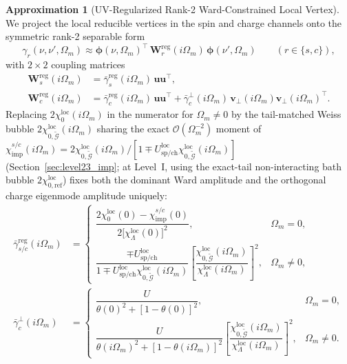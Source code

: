 \documentclass[11pt,a4paper]{article}
\numberwithin{equation}{section}
\theoremstyle{plain}
\theoremstyle{definition}
\newtheorem{approximation}{Approximation}[section]
\begin{document}
\begin{approximation}[UV-Regularized Rank-2 Ward-Constrained Local Vertex]
\label{approx:rank2_Wc}
We project the local reducible vertices in the spin and charge channels onto the
symmetric rank-2 separable form
\begin{equation}
    \gamma_r(\nu,\nu',\Omega_m)
    \approx \boldsymbol{\phi}(\nu,\Omega_m)^\top\,
            \mathbf{W}_r^{\mathrm{reg}}(i\Omega_m)\,
            \boldsymbol{\phi}(\nu',\Omega_m)
    \qquad (r \in \{s,c\}),
    \label{eq:gamma_rank2}
\end{equation}
with $2\times 2$ coupling matrices
\begin{align}
    \mathbf{W}_s^{\mathrm{reg}}(i\Omega_m)
    &= \bar{\gamma}_s^{\mathrm{reg}}(i\Omega_m)\, \mathbf{u}\mathbf{u}^\top,
    \label{eq:gamma_s_mat} \\
    \mathbf{W}_c^{\mathrm{reg}}(i\Omega_m)
    &= \bar{\gamma}_c^{\mathrm{reg}}(i\Omega_m)\, \mathbf{u}\mathbf{u}^\top
       + \bar{\gamma}_c^{\perp}(i\Omega_m)\, \mathbf{v}_\perp(i\Omega_m)\mathbf{v}_\perp(i\Omega_m)^\top.
    \label{eq:gamma_c_mat}
\end{align}
Replacing $2\chi_0^{\mathrm{loc}}(i\Omega_m)$ in the numerator for $\Omega_m \neq 0$ by
the tail-matched Weiss bubble $2\chi_{0,\tilde{\mathcal{G}}}^{\mathrm{loc}}(i\Omega_m)$
sharing the exact $\mathcal{O}(\Omega_m^{-2})$ moment of
$\chi_{\mathrm{imp}}^{s/c}(i\Omega_m) = 2\chi_{0,\tilde{\mathcal{G}}}^{\mathrm{loc}}(i\Omega_m)/[1 \mp U_{\mathrm{sp/ch}}^{\mathrm{loc}}\chi_{0,\tilde{\mathcal{G}}}^{\mathrm{loc}}(i\Omega_m)]$
(Section~\ref{sec:level23_imp}; at Level~I, using the exact-tail non-interacting bath
bubble $2\chi_{0,\mathrm{ref}}^{\mathrm{loc}}$) fixes both the dominant Ward amplitude
and the orthogonal charge eigenmode amplitude uniquely:
\begin{align}
    \bar{\gamma}_{s/c}^{\mathrm{reg}}(i\Omega_m)
    &= \begin{cases}
        \dfrac{2\chi_0^{\mathrm{loc}}(0) - \chi_{\mathrm{imp}}^{s/c}(0)}
              {2\bigl[\chi_{\Lambda}^{\mathrm{loc}}(0)\bigr]^2}, & \Omega_m = 0, \\[2.4ex]
        \dfrac{\mp U_{\mathrm{sp/ch}}^{\mathrm{loc}}}
              {1 \mp U_{\mathrm{sp/ch}}^{\mathrm{loc}}\chi_{0,\tilde{\mathcal{G}}}^{\mathrm{loc}}(i\Omega_m)}
        \left[\dfrac{\chi_{0,\tilde{\mathcal{G}}}^{\mathrm{loc}}(i\Omega_m)}
                    {\chi_\Lambda^{\mathrm{loc}}(i\Omega_m)}\right]^2, & \Omega_m \neq 0,
       \end{cases}
    \label{eq:gamma_reg_piecewise} \\
    \bar{\gamma}_c^{\perp}(i\Omega_m)
    &= \begin{cases}
        \dfrac{U}{\theta(0)^2 + [1 - \theta(0)]^2}, & \Omega_m = 0, \\[2.4ex]
        \dfrac{U}{\theta(i\Omega_m)^2 + [1 - \theta(i\Omega_m)]^2}
        \left[\dfrac{\chi_{0,\tilde{\mathcal{G}}}^{\mathrm{loc}}(i\Omega_m)}
                    {\chi_\Lambda^{\mathrm{loc}}(i\Omega_m)}\right]^2, & \Omega_m \neq 0.
       \end{cases}
    \label{eq:gamma_c_perp}
\end{align}
\end{approximation}
\end{document}
